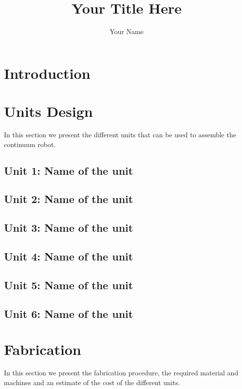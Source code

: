 \documentclass[12pt]{article}
\begin{document}
\title{Your Title Here}
\author{Your Name}

\maketitle
\begin{abstract}

\end{abstract}



\section{Introduction}



\section{Units Design}
In this section we present the different units that can be used to assemble the continuum robot. 

\subsection{Unit 1: Name of the unit}
\subsection{Unit 2: Name of the unit}
\subsection{Unit 3: Name of the unit}
\subsection{Unit 4: Name of the unit}
\subsection{Unit 5: Name of the unit}
\subsection{Unit 6: Name of the unit}



\section{Fabrication}
In this section we present the fabrication procedure, the required material and machines and an estimate of the cost of the different units.
\end{document}
